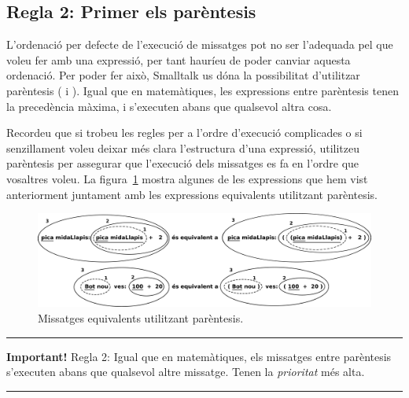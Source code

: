 \subsection{Regla 2: Primer els parèntesis}
L'ordenació per defecte de l'execució de missatges pot no ser l'adequada pel que voleu fer amb una expressió, per tant hauríeu de poder canviar aquesta ordenació. Per poder fer això, Smalltalk us dóna la possibilitat d'utilitzar parèntesis ( i ). Igual que en matemàtiques, les expressions entre parèntesis tenen la precedència màxima, i s'executen abans que qualsevol altra cosa.

Recordeu que si trobeu les regles per a l'ordre d'execució complicades o si senzillament voleu deixar més clara l'estructura d'una expressió, utilitzeu parèntesis per assegurar que l'execució dels missatges es fa en l'ordre que vosaltres voleu. La figura~\ref{fig1104} mostra algunes de les expressions que hem vist anteriorment juntament amb les expressions equivalents utilitzant parèntesis.
\begin{figure}[h]
\begin{center}
\includegraphics[scale=0.15]{Imatges/figura11-4.pdf}
\end{center}
\caption{Missatges equivalents utilitzant parèntesis.}
\label{fig1104}
\end{figure}

\noindent
\rule{\textwidth}{2pt}
\noindent
\textbf{Important!} Regla 2: Igual que en matemàtiques, els missatges entre parèntesis s'executen abans que qualsevol altre missatge. Tenen la \emph{prioritat} més alta. 

\noindent
\rule{\textwidth}{2pt}

